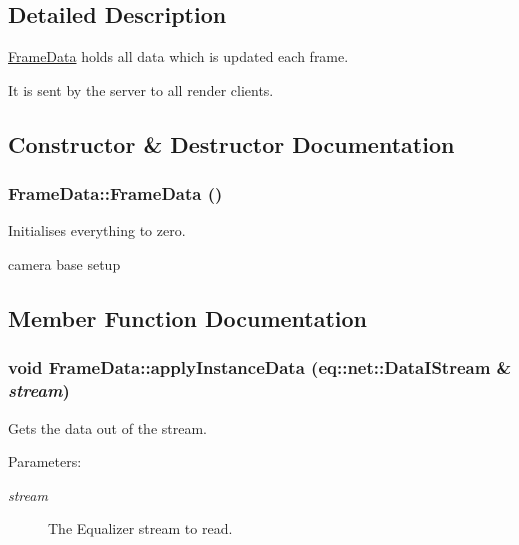 \subsection{Detailed Description}
\hyperlink{a00010}{FrameData} holds all data which is updated each frame. 

It is sent by the server to all render clients. 

\subsection{Constructor \& Destructor Documentation}
\hypertarget{a00010_25212bee682363205562fae39028c3d6}{
\subsubsection[{FrameData}]{\setlength{\rightskip}{0pt plus 5cm}FrameData::FrameData ()}}
\label{a00010_25212bee682363205562fae39028c3d6}


Initialises everything to zero. 



camera base setup 

\subsection{Member Function Documentation}
\hypertarget{a00010_2dc720c76b371a3bd5edba7020808542}{
\subsubsection[{applyInstanceData}]{\setlength{\rightskip}{0pt plus 5cm}void FrameData::applyInstanceData (eq::net::DataIStream \& {\em stream})}}
\label{a00010_2dc720c76b371a3bd5edba7020808542}


Gets the data out of the stream. 

\begin{Desc}
\item[Parameters:]
\begin{description}
\item[{\em stream}]The Equalizer stream to read. \end{description}
\end{Desc}


